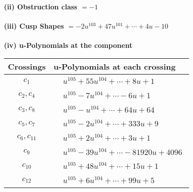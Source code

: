 \documentclass[1p]{elsarticle_modified}
\theoremstyle{definition}
\begin{document}
\flushleft \textbf{(ii) Obstruction class $= -1$}\\~\\
\flushleft \textbf{(iii) Cusp Shapes $= -2 u^{103}+47 u^{101}+\cdots+4 u-10$}\\~\\
\newpage\renewcommand{\arraystretch}{1}
\flushleft \textbf{(iv) u-Polynomials at the component}\newline \\
\begin{tabular}{m{50pt}|m{274pt}}
Crossings & \hspace{64pt}u-Polynomials at each crossing \\
\hline $$\begin{aligned}c_{1}\end{aligned}$$&$\begin{aligned}
&u^{105}+55 u^{104}+\cdots+8 u+1
\end{aligned}$\\
\hline $$\begin{aligned}c_{2},c_{4}\end{aligned}$$&$\begin{aligned}
&u^{105}-7 u^{104}+\cdots-6 u+1
\end{aligned}$\\
\hline $$\begin{aligned}c_{3},c_{8}\end{aligned}$$&$\begin{aligned}
&u^{105}- u^{104}+\cdots+64 u+64
\end{aligned}$\\
\hline $$\begin{aligned}c_{5},c_{7}\end{aligned}$$&$\begin{aligned}
&u^{105}-2 u^{104}+\cdots+333 u+9
\end{aligned}$\\
\hline $$\begin{aligned}c_{6},c_{11}\end{aligned}$$&$\begin{aligned}
&u^{105}+2 u^{104}+\cdots+3 u+1
\end{aligned}$\\
\hline $$\begin{aligned}c_{9}\end{aligned}$$&$\begin{aligned}
&u^{105}-39 u^{104}+\cdots-81920 u+4096
\end{aligned}$\\
\hline $$\begin{aligned}c_{10}\end{aligned}$$&$\begin{aligned}
&u^{105}+48 u^{104}+\cdots+15 u+1
\end{aligned}$\\
\hline $$\begin{aligned}c_{12}\end{aligned}$$&$\begin{aligned}
&u^{105}+6 u^{104}+\cdots+99 u+5
\end{aligned}$\\
\hline
\end{tabular}\\~\\
\end{document}
